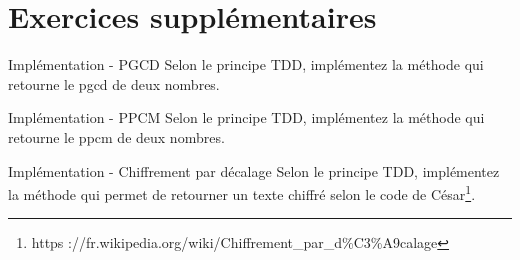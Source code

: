 \documentclass[a4paper,11pt]{article}
\begin{document}
\section{Exercices supplémentaires}
	\begin{Exercice}{Implémentation - PGCD}
		Selon le principe TDD, implémentez la méthode  qui retourne le pgcd de deux nombres.
	\end{Exercice}

	\begin{Exercice}{Implémentation - PPCM}
		Selon le principe TDD, implémentez la méthode  qui retourne le ppcm de deux nombres.
	\end{Exercice}

	\begin{Exercice}{Implémentation - Chiffrement par décalage}
		Selon le principe TDD, implémentez la méthode  qui permet de retourner un texte chiffré selon le code de César\footnote{https ://fr.wikipedia.org/wiki/Chiffrement\_par\_d\%C3\%A9calage}.
		
	\end{Exercice}
\end{document}
